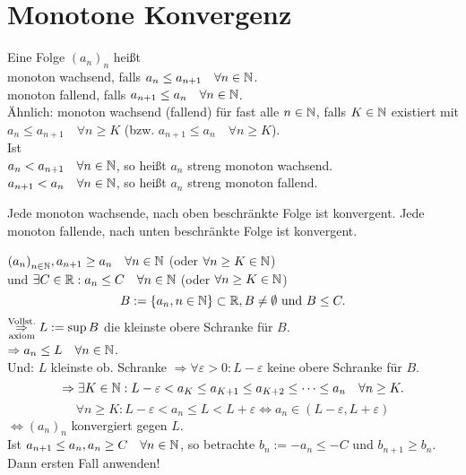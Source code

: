 \documentclass[../ana1.tex]{subfiles}
\begin{document}
\setcounter{section}{7}

\section{Monotone Konvergenz}
\begin{defi}
	Eine Folge \({(a_n)}_n\) heißt \\
	monoton wachsend, falls \(a_n\leq a_{n+1} \quad \forall n\in\mathbb{N} \).\\
	monoton fallend, falls \(a_{n+1} \leq a_n \quad\forall n\in\mathbb{N} \).\\
	Ähnlich: monoton wachsend (fallend) für fast alle \(n\in\mathbb{N} \), falls \( K\in\mathbb{N} \) existiert mit \( a_n\leq a_{n+1} \quad \forall n\geq K \) (bzw. \(a_{n+1}\leq a_n \quad \forall n\geq K \)).\\
	Ist \\
	\( a_n<a_{n+1} \quad \forall n\in\mathbb{N} \), so heißt \(a_n\) streng monoton wachsend.\\
	\( a_{n+1}<a_n \quad \forall n\in\mathbb{N} \), so heißt \(a_n\) streng monoton fallend.
\end{defi}
\begin{satz}
	Jede monoton wachsende, nach oben beschränkte Folge ist konvergent. Jede monoton fallende, nach unten beschränkte Folge ist konvergent.
\end{satz}
\begin{bew}
	\({(a_n)}_{n\in\mathbb{N}}, a_{n+1} \geq a_n \quad \forall n\in\mathbb{N} \) (oder \( \forall n\geq K \in\mathbb{N} \))\\
	und \( \exists C\in\mathbb{R}: a_n \leq C \quad \forall n\in\mathbb{N} \) (oder \( \forall n\geq K \in\mathbb{N} \))\\
	\[ B:= \{a_n, n\in\mathbb{N} \} \subset \mathbb{R}, B\neq \emptyset \text{ und } B\leq C. \]
	\(\overset{\text{Vollst.}}{\underset{\text{axiom}}{\Rightarrow}} L := \sup B\) die kleinste obere Schranke für \(B\).\\
	\(\Rightarrow a_n \leq L \quad \forall n\in\mathbb{N} \).\\
	Und: \(L\) kleinste ob. Schranke \( \Rightarrow \forall \varepsilon>0: L-\varepsilon \) keine obere Schranke für \(B\).\\
	\[ \Rightarrow \exists K \in\mathbb{N}: L-\varepsilon < a_K \leq a_{K+1} \leq a_{K+2} \leq \cdots \leq a_n \quad \forall n\geq K. \]
	\[ \forall n\geq K: L-\varepsilon < a_n \leq L < L + \varepsilon \Leftrightarrow a_n \in (L-\varepsilon, L + \varepsilon) \]
	\( \Leftrightarrow {(a_n)}_n \) konvergiert gegen \(L\).\\
	Ist \(a_{n+1} \leq a_n, a_n\geq C \quad \forall n\in\mathbb{N} \), so betrachte \(b_n := -a_n \leq -C \) und \(b_{n+1} \geq b_n\). Dann ersten Fall anwenden!
\end{bew}
\end{document}

